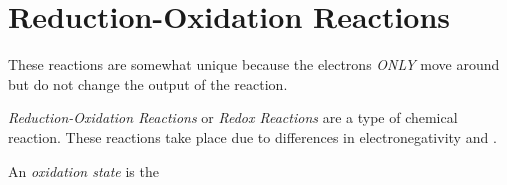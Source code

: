 \section{Reduction-Oxidation Reactions} \label{sec:Redox Reactions}
These reactions are somewhat unique because the electrons \emph{ONLY} move around but do not change the output of the reaction.

\begin{definition} \label{def:Redox Reactions}
  \emph{Reduction-Oxidation Reactions} or \emph{Redox Reactions} are a type of chemical reaction.
  These reactions take place due to differences in electronegativity and .
\end{definition}

\begin{definition} \label{def:Oxidation States}
  An \emph{oxidation state} is the \textellipsis
\end{definition}
